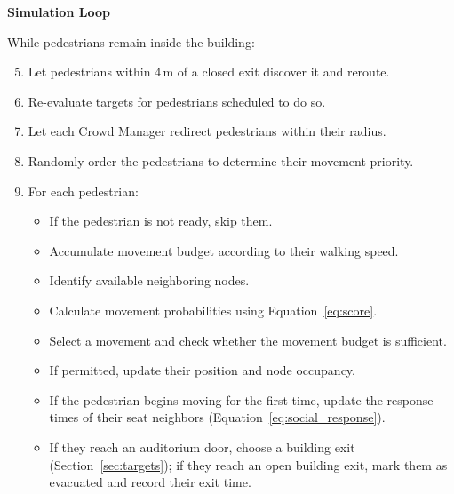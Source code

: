 \documentclass{article}
\begin{document}
\textbf{Simulation Loop}

While pedestrians remain inside the building:

\begin{enumerate}
    \setcounter{enumi}{4}

    \item Let pedestrians within 4\,m of a closed exit discover it and reroute.

    \item Re-evaluate targets for pedestrians scheduled to do so.

    \item Let each Crowd Manager redirect pedestrians within their radius.

    \item Randomly order the pedestrians to determine their
    movement priority.

    \item For each pedestrian:
    \begin{itemize}
        \item If the pedestrian is not ready, skip them.

        \item Accumulate movement budget according to
        their walking speed.

        \item Identify available neighboring nodes.

        \item Calculate movement probabilities using
        Equation~\ref{eq:score}.

        \item Select a movement and check whether
        the movement budget is sufficient.

        \item If permitted, update their position
        and node occupancy.

        \item If the pedestrian begins moving for the
        first time, update the response times of their seat neighbors (Equation~\ref{eq:social_response}).

        \item If they reach an auditorium door, choose a building exit (Section~\ref{sec:targets}); if they reach an open building exit, mark them
        as evacuated and record their exit time.
    \end{itemize}
\end{enumerate}
\end{document}

